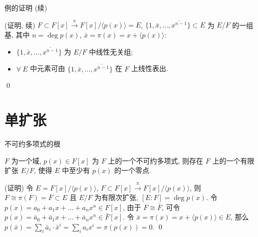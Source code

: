 
\begin{frame}{例的证明 (续)}

\startproof[bg=yellow, fg=red](证明, 续)
$F \subset F[x] \xrightarrow{\ \pi\ } F[x]/\langle p(x) \rangle = E$,
$\{ 1, \bar{x}, \dots, \overline{x^{n-1}} \} \subset E$
为 $E/F$ 的一组基, 其中 $n = \deg p(x)$, $\bar{x} = \pi(x) = x + \langle p(x) \rangle$:
\begin{itemize}
\item {} $\{ 1, \bar{x}, \dots, \overline{x^{n-1}} \}$
  为 $E/F$ 中线性无关组;
\item {} $\forall\ E$ 中元素可由
  $\{ 1, \bar{x}, \dots, \overline{x^{n-1}} \}$ 在 $F$ 上线性表出.
\end{itemize}
\qed

\end{frame}


\section[单扩张]{单扩张}


\begin{frame}{不可约多项式的根}

\begin{lem}[不可约多项式的根]
$F$ 为一个域, $p(x) \in F[x]$ 为 $F$ 上的一个不可约多项式,
则存在 $F$ 上的一个有限扩张 $E/F$, 使得 $E$ 中至少有 $p(x)$ 的一个零点.
\end{lem}

\startproof[bg=yellow, fg=red](证明)
令 $E = F[x]/\langle p(x) \rangle$,
$F \subset F[x] \xrightarrow{\ \pi\ } F[x]/\langle p(x) \rangle$,
则 $F \cong \pi(F) = \bar{F} \subset E$ 且 $E/F$ 为有限次扩张,
$[E:F] = \deg p(x)$.
令 $p(x) = a_0 + a_1 x + \dots + a_n x^n \in F[x]$, 由于 $F \cong \bar{F}$,
可令 $p(x) = \bar{a}_0 + \bar{a}_1 x + \dots + \bar{a}_n x^n \in \bar{F}[x]$.
令 $\bar{x} = \pi(x) = x + \langle p(x) \rangle \in E$,
那么 $p(\bar{x}) = \sum_i \bar{a}_i \cdot \bar{x}^i = \sum_i a_i x^i = \pi(p(x)) = 0$.
\qed

\end{frame}


